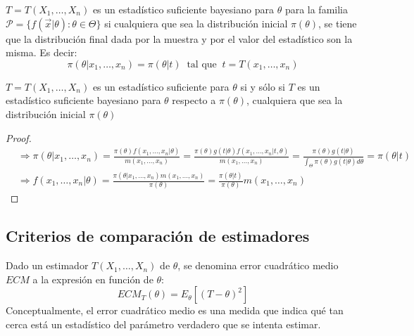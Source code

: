 \begin{definición}
$T = T(X_1, \ldots, X_n)$ es un estadístico suficiente bayesiano para $\theta$ para la familia $\mathcal{P} = \{f(\vec{x}|\theta) : \theta \in \Theta\}$ si cualquiera que sea la distribución inicial $\pi(\theta)$, se tiene que la distribución final dada por la muestra y por el valor del estadístico son la misma. Es decir:
$$\pi(\theta | x_1, \ldots, x_n) = \pi(\theta | t) \ \text{ tal que } \ t = T(x_1, \ldots, x_n)$$
\end{definición}

\begin{teorema}
  $T = T(X_1, \ldots, X_n)$ es un estadístico suficiente para $\theta$ si y sólo si $T$ es un estadístico suficiente bayesiano para $\theta$ respecto a $\pi(\theta)$, cualquiera que sea la distribución inicial $\pi(\theta)$
\end{teorema}

\begin{proof}
  $$\begin{aligned}
       & \Rightarrow \pi(\theta | x_1, \ldots, x_n) = \frac{\pi(\theta)f(x_1, \ldots, x_n | \theta)}{m(x_1, \ldots, x_n)} = \frac{\pi(\theta)g(t | \theta)f(x_1, \ldots, x_n | t, \theta)}{m(x_1, \ldots, x_n)} = \frac{\pi(\theta)g(t | \theta)}{\int_{\Theta}\pi(\theta)g(t | \theta)d\theta} = \pi(\theta | t) \\
       & \Rightarrow f(x_1, \ldots, x_n | \theta) = \frac{\pi(\theta | x_1, \ldots, x_n)m(x_1, \ldots, x_n)}{\pi(\theta)} = \frac{\pi(\theta | t)}{\pi(\theta)}m(x_1, \ldots, x_n)
    \end{aligned}$$
\end{proof}

\subsection{Criterios de comparación de estimadores}

\begin{definición}
Dado un estimador $T(X_1, \ldots, X_n)$ de $\theta$, se denomina error cuadrático medio $ECM$ a la expresión en función de $\theta$:
$$ECM_T(\theta) = E_{\theta}[(T - \theta)^2]$$
Conceptualmente, el error cuadrático medio es una medida que indica qué tan cerca está un estadístico del parámetro verdadero que se intenta estimar.
\end{definición}

